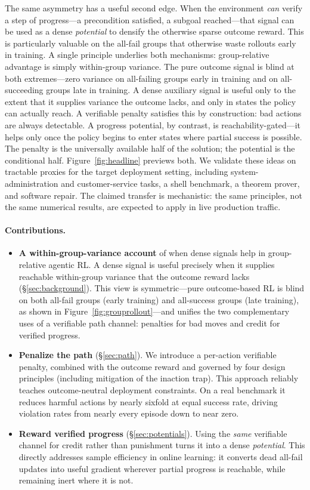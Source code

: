 The same asymmetry has a useful second edge. When the environment \emph{can} verify a step of progress---a precondition satisfied, a subgoal reached---that signal can be used as a dense \emph{potential} to densify the otherwise sparse outcome reward. This is particularly valuable on the all-fail groups that otherwise waste rollouts early in training. A single principle underlies both mechanisms: group-relative advantage is simply within-group variance. The pure outcome signal is blind at both extremes---zero variance on all-failing groups early in training and on all-succeeding groups late in training. A dense auxiliary signal is useful only to the extent that it supplies variance the outcome lacks, and only in states the policy can actually reach. A verifiable penalty satisfies this by construction: bad actions are always detectable. A progress potential, by contrast, is reachability-gated---it helps only once the policy begins to enter states where partial success is possible. The penalty is the universally available half of the solution; the potential is the conditional half. Figure~\ref{fig:headline} previews both. We validate these ideas on tractable proxies for the target deployment setting, including system-administration and customer-service tasks, a shell benchmark, a theorem prover, and software repair. The claimed transfer is mechanistic: the same principles, not the same numerical results, are expected to apply in live production traffic.

\paragraph{Contributions.}
\begin{itemize}[leftmargin=1.4em,itemsep=1pt,topsep=2pt]
\item \textbf{A within-group-variance account} of when dense signals help in group-relative agentic RL. A dense signal is useful precisely when it supplies reachable within-group variance that the outcome reward lacks (\S\ref{sec:background}). This view is symmetric---pure outcome-based RL is blind on both all-fail groups (early training) and all-success groups (late training), as shown in Figure~\ref{fig:grouprollout}---and unifies the two complementary uses of a verifiable path channel: penalties for bad moves and credit for verified progress.
\item \textbf{Penalize the path} (\S\ref{sec:path}). We introduce a per-action verifiable penalty, combined with the outcome reward and governed by four design principles (including mitigation of the inaction trap). This approach reliably teaches outcome-neutral deployment constraints. On a real benchmark it reduces harmful actions by nearly sixfold at equal success rate, driving violation rates from nearly every episode down to near zero.
\item \textbf{Reward verified progress} (\S\ref{sec:potentials}). Using the \emph{same} verifiable channel for credit rather than punishment turns it into a dense \emph{potential}. This directly addresses sample efficiency in online learning: it converts dead all-fail updates into useful gradient wherever partial progress is reachable, while remaining inert where it is not.
\end{itemize}

